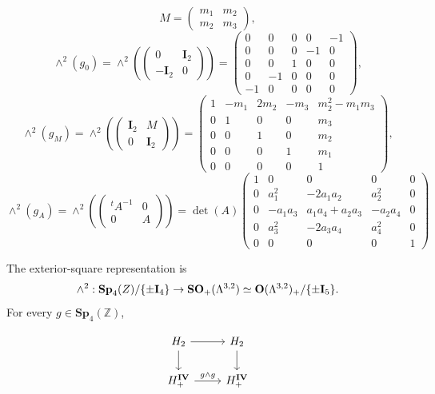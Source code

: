 \documentclass[11pt]{memoir}
\newcommand{\Z}{\mathbb{Z}} \newcommand{\C}{\mathbb{C}}
\newcommand{\Sp}{\mathbf{Sp}}
\newcommand{\Orth}{\mathbf{O}}
\newcommand{\SO}{\mathbf{SO}}
\newcommand{\Hpl}{\mathbb{H}}
\newcommand{\IV}{\mathbf{IV}}
\newcommand{\Id}{\mathbf{I}}
\begin{document}
$$M=\begin{pmatrix}m_1&m_2\\m_2&m_3\end{pmatrix},$$
$$\wedge^2(g_0)
=\wedge^2\!\left(\begin{pmatrix}0 & \Id_2 \\ -\Id_2 & 0\end{pmatrix}\right)
= \begin{pmatrix}
0 & 0 & 0 & 0 & -1\\
0 & 0 & 0 & -1 & 0\\
0 & 0 & 1 & 0 & 0\\
0 & -1 & 0 & 0 & 0\\
-1 & 0 & 0 & 0 & 0
\end{pmatrix},$$
$$\wedge^2(g_M)
=\wedge^2\!\left(\begin{pmatrix}\Id_2 & M\\ 0 & \Id_2\end{pmatrix}\right)
= \begin{pmatrix}1 & -m_1 & 2m_2 & -m_3 & m_2^2 - m_1 m_3\\
0 & 1 & 0 & 0 & m_3\\
0 & 0 & 1 & 0 & m_2\\
0 & 0 & 0 & 1 & m_1\\
0 & 0 & 0 & 0 & 1\end{pmatrix},$$
$$\wedge^2(g_A)
=\wedge^2\!\left(\begin{pmatrix}{}^tA^{-1} & 0\\0 & A\end{pmatrix}\right)
= \det(A)\begin{pmatrix}1 & 0 & 0 & 0 & 0\\
0 & a_1^2 & -2a_1a_2 & a_2^2 & 0\\
0 & -a_1a_3 & a_1a_4 + a_2a_3 & -a_2a_4 & 0\\
0 & a_3^2 & -2a_3a_4 & a_4^2 & 0\\
0 & 0 & 0 & 0 & 1\end{pmatrix}$$

\begin{lemma}
The exterior-square representation is
$$\wedge^2 :
\Sp_4(\Z)/\{\pm \Id_4\} \rightarrow \SO_+(\La^{3,2}) \simeq
\Orth(\La^{3,2})_+/\{\pm\Id_5\}.$$
For every $g\in\Sp_4(\Z)$,

  \[ \begin{tikzcd}
\Hpl_2 \arrow{r}{} \arrow[swap]{d}{} & \Hpl_2 \arrow{d}{} \\%
\Hpl_+^{\IV} \arrow{r}{g \wedge g}& \Hpl_+^{\IV}
\end{tikzcd}
\]
\end{lemma}
\end{document}
